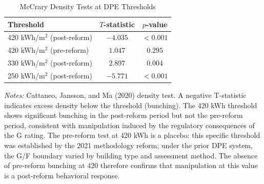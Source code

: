 \begin{table}[htbp]
\centering
\caption{McCrary Density Tests at DPE Thresholds}
\label{tab:density}
\begin{tabular}{lcc}
\toprule
Threshold & $T$-statistic & $p$-value \\
\midrule
420 kWh/m$^2$ (post-reform) & $-4.035$ & $<0.001$ \\
420 kWh/m$^2$ (pre-reform) & $1.047$ & $0.295$ \\
330 kWh/m$^2$ (post-reform) & $2.897$ & $0.004$ \\
250 kWh/m$^2$ (post-reform) & $-5.771$ & $<0.001$ \\
\bottomrule
\end{tabular}
\begin{tablenotes}
\small
\item \textit{Notes:} Cattaneo, Jansson, and Ma (2020) density test. A negative T-statistic indicates excess density below the threshold (bunching). The 420 kWh threshold shows significant bunching in the post-reform period but not the pre-reform period, consistent with manipulation induced by the regulatory consequences of the G rating. The pre-reform test at 420 kWh is a placebo: this specific threshold was established by the 2021 methodology reform; under the prior DPE system, the G/F boundary varied by building type and assessment method. The absence of pre-reform bunching at 420 therefore confirms that manipulation at this value is a post-reform behavioral response.
\end{tablenotes}
\end{table}
